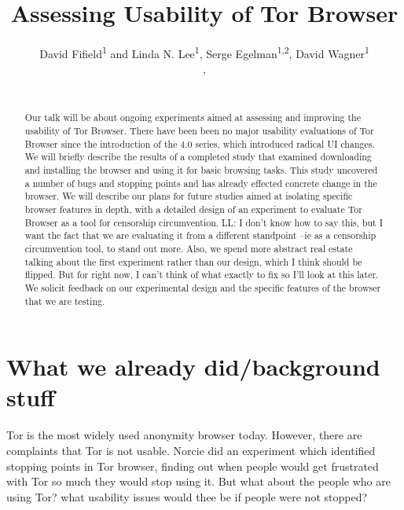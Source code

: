 \documentclass{sig-alternate-hotpets15}
\begin{document}
\title{Assessing Usability of Tor Browser}
\author{
 \alignauthor David Fifield\textsuperscript{1} and Linda N. Lee\textsuperscript{1}, Serge Egelman\textsuperscript{1,2}, David Wagner\textsuperscript{1}\\
   \vspace{0.5em}
   , \\
   \\
}

\maketitle

\begin{abstract}
Our talk will be about ongoing experiments aimed at
assessing and improving the usability of Tor Browser.
There have been been no major usability evaluations of
Tor Browser since the introduction of the 4.0 series,
which introduced radical UI changes.
We will briefly describe the results of a completed study
that examined downloading and installing the browser
and using it for basic browsing tasks.
This study uncovered a number of bugs and stopping points
and has already effected concrete change in the browser.
We will describe our plans for future studies aimed at
isolating specific browser features in depth,
with a detailed design of an experiment to evaluate
Tor Browser as a tool for censorship circumvention.
{\color {red}LL: I don't know how to say this, but I want the fact that we are evaluating it from a different standpoint --ie as a censorship circumvention tool, to stand out more. Also, we spend more abstract real estate talking about the first experiment rather than our design, which I think should be flipped. But for right now, I can't think of what exactly to fix so I'll look at this later.}
We solicit feedback on our experimental design
and the specific features of the browser that we are testing.
\end{abstract}


\section{What we already did/background stuff}
Tor is the most widely used anonymity browser today. However, there are complaints that Tor is not usable. Norcie did an experiment \cite{norcie2012eliminating} which identified stopping points in Tor browser, finding out when people would get frustrated with Tor so much they would stop using it. But what about the people who are using Tor? what usability issues would thee be if people were not stopped? 
\end{document}
